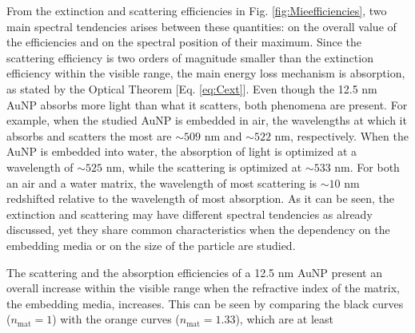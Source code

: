 From the extinction and scattering efficiencies in Fig. \ref{fig:Mieefficiencies}, two main spectral tendencies arises between these quantities: on the overall value of the efficiencies and on the spectral position of their maximum. Since the scattering efficiency is two orders of magnitude smaller than the extinction efficiency within the visible range, the main energy loss mechanism is absorption, as stated by the Optical Theorem [Eq. \eqref{eq:Cext}]. Even though the 12.5 nm AuNP absorbs more light than what it scatters, both phenomena are present. For example, when the  studied AuNP is embedded in air, the wavelengths at which it absorbs and scatters the most are $\sim 509$ nm and $\sim 522$ nm, respectively. When the AuNP is embedded into water, the absorption of light is optimized at a wavelength of $\sim 525$ nm, while the scattering is optimized at $\sim 533$ nm. For both an air and a water matrix, the wavelength of most scattering is $\sim 10$ nm redshifted relative to the wavelength of most absorption. As it can be seen, the extinction and scattering may have different spectral tendencies as already discussed, yet they share common characteristics   when the dependency on the embedding media or on the size of the particle are studied.

The scattering and the absorption efficiencies of a 12.5 nm AuNP present an overall increase within the visible range when the refractive index of the matrix, the embedding media,  increases. This can be seen by comparing the black curves ($n_\text{mat} = 1$) with the orange curves ($n_\text{mat} = 1.33$), which are at least 
 

 

 
 
